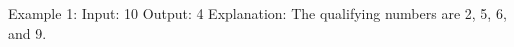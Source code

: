 \begin{enumerate}
\begin{consolethree}
Example 1:
Input: 10
Output: 4
Explanation: The qualifying numbers are 2, 5, 6, and 9.
\end{consolethree}
\newpage

\end{enumerate}
